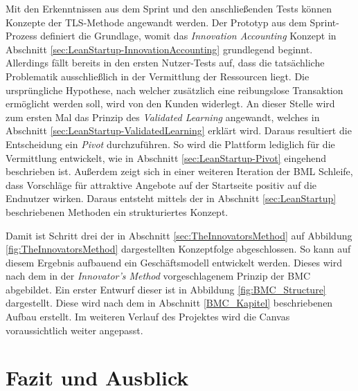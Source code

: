 Mit den Erkenntnissen aus dem Sprint und den anschließenden Tests können Konzepte der \ac{TLS}-Methode angewandt werden. Der Prototyp aus dem Sprint-Prozess definiert die Grundlage, womit das \textit{Innovation Accounting} Konzept in Abschnitt \ref{sec:LeanStartup-InnovationAccounting} grundlegend beginnt. Allerdings fällt bereits in den ersten Nutzer-Tests auf, dass die tatsächliche Problematik ausschließlich in der Vermittlung der Ressourcen liegt. Die ursprüngliche Hypothese, nach welcher zusätzlich eine reibungslose Transaktion ermöglicht werden soll, wird von den Kunden widerlegt. An dieser Stelle wird zum ersten Mal das Prinzip des \textit{Validated Learning} angewandt, welches in Abschnitt \ref{sec:LeanStartup-ValidatedLearning} erklärt wird. Daraus resultiert die Entscheidung ein \textit{Pivot} durchzuführen. So wird die Plattform lediglich für die Vermittlung entwickelt, wie in Abschnitt \ref{sec:LeanStartup-Pivot} eingehend beschrieben ist. Außerdem zeigt sich in einer weiteren Iteration der \ac{BML} Schleife, dass Vorschläge für attraktive Angebote auf der Startseite positiv auf die Endnutzer wirken. Daraus entsteht mittels der in Abschnitt \ref{sec:LeanStartup} beschriebenen Methoden ein strukturiertes Konzept. 

Damit ist Schritt drei der in Abschnitt \ref{sec:TheInnovatorsMethod} auf Abbildung \ref{fig:TheInnovatorsMethod} dargestellten Konzeptfolge abgeschlossen. So kann auf diesem Ergebnis aufbauend ein Geschäftsmodell entwickelt werden. Dieses wird nach dem in der \textit{Innovator's Method} vorgeschlagenem Prinzip der \ac{BMC} abgebildet. Ein erster Entwurf dieser ist in Abbildung \ref{fig:BMC_Structure} dargestellt. Diese wird nach dem in Abschnitt \ref{BMC_Kapitel} beschriebenen Aufbau erstellt. Im weiteren Verlauf des Projektes wird die Canvas voraussichtlich weiter angepasst.

\section{Fazit und Ausblick}


